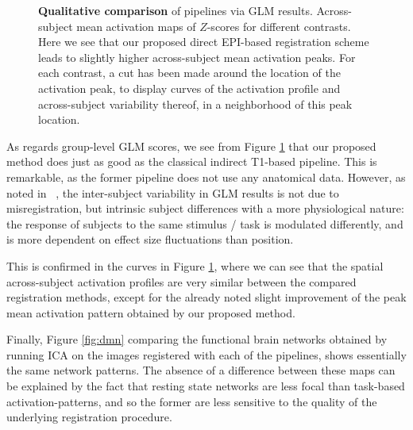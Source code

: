 \begin{figure}[!htbp]
\caption{\textbf{Qualitative comparison} of pipelines via GLM results.
  Across-subject mean activation maps of $Z$-scores for different contrasts.
  Here we see that our proposed direct EPI-based registration scheme leads to slightly higher across-subject mean activation peaks.  For each contrast, a cut has been made around the location of the activation peak, to display curves of the activation profile and across-subject variability thereof, in a neighborhood of this peak location.
}
\label{fig:zmaps}
\end{figure}

As regards group-level GLM scores, we see from Figure \ref{fig:zmaps}
that our proposed method does just as good as the classical indirect
T1-based pipeline. This is remarkable, as the former pipeline does not
use any anatomical data.
However, as noted in ~\citep{thirion2007analysis,pmid22425669}, the
inter-subject variability in GLM results is not due to
misregistration, but intrinsic subject differences with a more
physiological nature: the response of subjects to the same stimulus /
task is modulated differently, and is more dependent on effect size fluctuations than position. 

%
This
is confirmed in the curves in Figure \ref{fig:zmaps}, where we can see that the spatial across-subject activation profiles
are very similar between the compared registration methods, except for the already noted
slight improvement of the peak mean activation pattern obtained by our proposed method.

Finally, Figure \ref{fig:dmn} comparing the functional brain networks obtained by running
ICA on the images registered with each of the pipelines, shows essentially the same network
patterns. The absence of a difference between these maps can be explained by the fact that
resting state networks are less focal than task-based activation-patterns, and
so the former are less sensitive to the quality of the underlying registration procedure.

